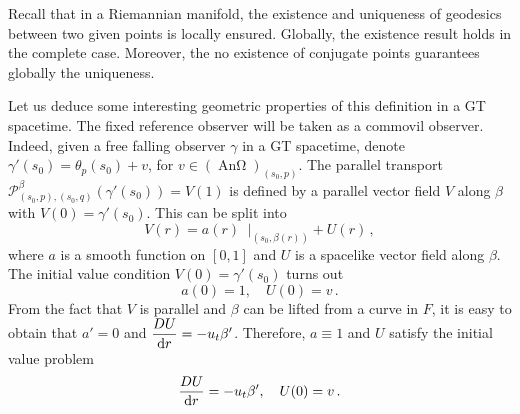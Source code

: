 \documentclass[12pt]{article}
\newcommand{\mfrac}[2]{\mbox{\footnotesize$\displaystyle\frac{#1}{#2}$}}
\newcommand{\diff}{\mathrm{d}}
\newcommand{\ds}{\diff s}
\DeclareMathOperator{\pt}{\partial_t}
\DeclareMathOperator{\An}{\text{An}\Omega}
\begin{document}
Recall that in a Riemannian manifold, the existence and uniqueness of geodesics between two given points is locally ensured. Globally, the existence result holds in the complete case. Moreover, the no existence of conjugate points guarantees globally the uniqueness.

Let us deduce some interesting geometric properties of this definition in a GT spacetime. The fixed reference observer will be taken as a commovil observer.
Indeed, given a free falling observer $\gamma$ in a GT spacetime, denote $\gamma'(s_0) = \theta_p(s_0) + v$, for $v\in (\An)_{(s_0,p)}$. The parallel transport $\mathcal{P}^\beta_{(s_0,p),(s_0,q)} (\gamma'(s_0)) = V(1)$ is defined by a parallel vector field $V$ along $\beta$ with $V(0) = \gamma'(s_0)$. This can be split into 
$$V(r) = a(r) \pt|_{(s_0,\beta(r))} + U(r)\,,$$
where $a$ is a smooth function on $[0,1]$ and $U$ is a spacelike vector field along $\beta$. The initial value condition $V(0) = \gamma'(s_0)$ turns out
\[
    a(0) = 1, \quad U(0) = v\,.
\]
From the fact that $V$ is parallel and $\beta$ can be lifted from a curve in $F$, it is easy to obtain that $a'=0$ and $\mfrac{D U}{\diff r} = -u_t \beta'$. 
Therefore, $a\equiv 1$ and $U$ satisfy the initial value problem 
\[
    \mfrac{D U}{\diff r} = -u_t \beta', \quad U(0) = v\,.
\]
\end{document}
